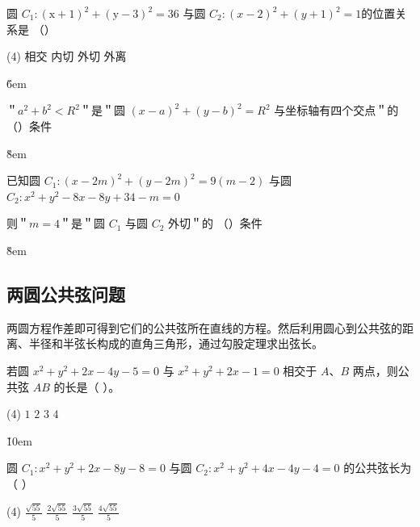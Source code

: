 \begin{example}
    圆 $C_1:(\mathrm{x}+1)^2+(\mathrm{y}-3)^2=36$ 与圆 $C_2:(x-2)^2+(y+1)^2=1$的位置关系是 （\qquad）
    \begin{tasks}(4)
        \task 相交
        \task 内切
        \task 外切
        \task 外离
    \end{tasks}
\end{example}

\v{6em}

\begin{example}
    ＂$a^2+b^2<R^2$＂是＂圆 $(x-a)^2+(y-b)^2=R^2$ 与坐标轴有四个交点＂的 （\qquad）条件
\end{example}

\v{8em}

\begin{example}
    已知圆 $C_1:(x-2 m)^2+(y-2 m)^2=9(m-2)$ 与圆 $C_2: x^2+y^2-8 x-8 y+34-m=0$

    则＂$m=4$＂是＂圆 $C_1$ 与圆 $C_2$ 外切＂的 （\qquad）条件
\end{example}

\v{8em}

\subsection{两圆公共弦问题}

\begin{theorem}[两圆公共弦问题]
    两圆方程作差即可得到它们的公共弦所在直线的方程。然后利用圆心到公共弦的距离、半径和半弦长构成的直角三角形，通过勾股定理求出弦长。
\end{theorem}
\begin{example}
    若圆 $x^2+y^2+2 x-4 y-5=0$ 与 $x^2+y^2+2 x-1=0$ 相交于 $A$、$B$ 两点，则公共弦 $A B$ 的长是（ \hspace{2em} ）。
    \begin{tasks}(4)
        \task $1$
        \task $2$
        \task $3$
        \task $4$
    \end{tasks}
\end{example}

\v{10em}

\begin{example}
    圆 $C_1: x^2+y^2+2 x-8 y-8=0$ 与圆 $C_2: x^2+y^2+4 x-4 y-4=0$ 的公共弦长为（ \hspace{2em} ）
    \begin{tasks}(4)
        \task $\frac{\sqrt{55}}{5}$
        \task $\frac{2 \sqrt{55}}{5}$
        \task $\frac{3 \sqrt{55}}{5}$
        \task $\frac{4 \sqrt{55}}{5}$
    \end{tasks}
\end{example}

